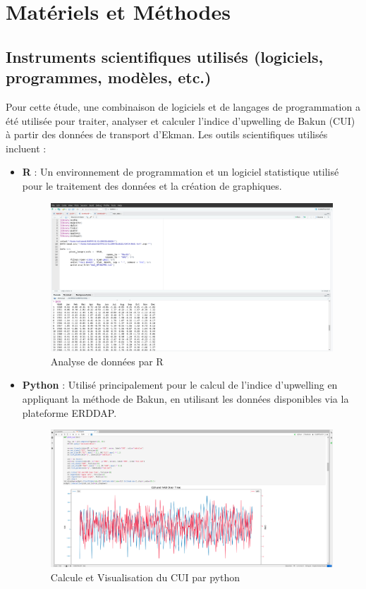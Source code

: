 \section{Matériels et Méthodes}

\subsection{Instruments scientifiques utilisés (logiciels, programmes, modèles, etc.)}
Pour cette étude, une combinaison de logiciels et de langages de programmation a été utilisée pour traiter, analyser et calculer l'indice d'upwelling de Bakun (CUI) à partir des données de transport d'Ekman. Les outils scientifiques utilisés incluent :

\begin{itemize}
    \item \textbf{R} : Un environnement de programmation et un logiciel statistique utilisé pour le traitement des données et la création de graphiques.
    
    \begin{figure}[H]
\includegraphics[scale=0.2]{R.png}
\caption{Analyse de données par R}
\end{figure}   
    
    
    \item \textbf{Python} : Utilisé principalement pour le calcul de l'indice d'upwelling en appliquant la méthode de Bakun, en utilisant les données disponibles via la plateforme ERDDAP.

\begin{figure}[H]
\includegraphics[scale=0.2]{python.png}
\caption{Calcule et Visualisation du CUI par python}
\end{figure}    
    

\end{itemize}
